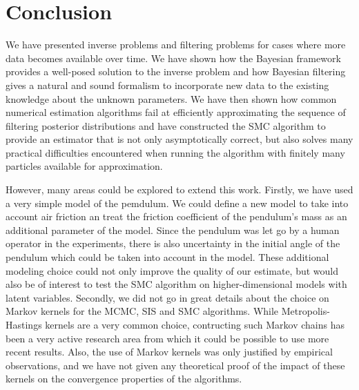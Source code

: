 \section{Conclusion}

We have presented inverse problems and filtering problems for cases where more data becomes available over time. We have shown how the Bayesian framework provides a well-posed solution to the inverse problem and how Bayesian filtering gives a natural and sound formalism to incorporate new data to the existing knowledge about the unknown parameters. We have then shown how common numerical estimation algorithms fail at efficiently approximating the sequence of filtering posterior distributions and have constructed the SMC algorithm to provide an estimator that is not only asymptotically correct, but also solves many practical difficulties encountered when running the algorithm with finitely many particles available for approximation.

However, many areas could be explored to extend this work. Firstly, we have used a very simple model of the pemdulum. We could define a new model to take into account air friction an treat the friction coefficient of the pendulum's mass as an additional parameter of the model. Since the pendulum was let go by a human operator in the experiments, there is also uncertainty in the initial angle of the pendulum which could be taken into account in the model. These additional modeling choice could not only improve the quality of our estimate, but would also be of interest to test the SMC algorithm on higher-dimensional models with latent variables. Secondly, we did not go in great details about the choice on Markov kernels for the MCMC, SIS and SMC algorithms. While Metropolis-Hastings kernels are a very common choice, contructing such Markov chains has been a very active research area from which it could be possible to use more recent results. Also, the use of Markov kernels was only justified by empirical observations, and we have not given any theoretical proof of the impact of these kernels on the convergence properties of the algorithms.

